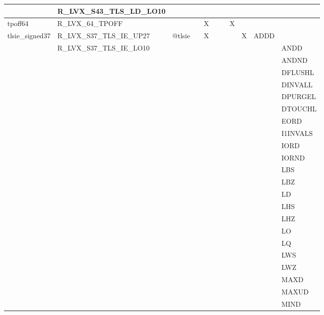 {\begin{tabular}{|l|l|l|l|l|l|l|l|l|l|l|}
 & \textsf{R\_LVX\_S43\_TLS\_LD\_LO10} & & & & & & & & & \\
\hline
\textsf{tpoff64} & \textsf{R\_LVX\_64\_TPOFF} & \textsf{} & \textsf{} & \textsf{X} & \textsf{} & \textsf{} & \textsf{X} & \textsf{} & \textsf{} \\
\hline
\textsf{tlsie\_signed37} & \textsf{R\_LVX\_S37\_TLS\_IE\_UP27} & \textsf{@tlsie} & \textsf{} & \textsf{X} & \textsf{} & \textsf{} & \textsf{} & \textsf{X} & \textsf{ADDD} \\
 & \textsf{R\_LVX\_S37\_TLS\_IE\_LO10} & & & & & & & & & \textsf{ANDD} \\
 & & & & & & & & & & \textsf{ANDND} \\
 & & & & & & & & & & \textsf{DFLUSHL} \\
 & & & & & & & & & & \textsf{DINVALL} \\
 & & & & & & & & & & \textsf{DPURGEL} \\
 & & & & & & & & & & \textsf{DTOUCHL} \\
 & & & & & & & & & & \textsf{EORD} \\
 & & & & & & & & & & \textsf{I1INVALS} \\
 & & & & & & & & & & \textsf{IORD} \\
 & & & & & & & & & & \textsf{IORND} \\
 & & & & & & & & & & \textsf{LBS} \\
 & & & & & & & & & & \textsf{LBZ} \\
 & & & & & & & & & & \textsf{LD} \\
 & & & & & & & & & & \textsf{LHS} \\
 & & & & & & & & & & \textsf{LHZ} \\
 & & & & & & & & & & \textsf{LO} \\
 & & & & & & & & & & \textsf{LQ} \\
 & & & & & & & & & & \textsf{LWS} \\
 & & & & & & & & & & \textsf{LWZ} \\
 & & & & & & & & & & \textsf{MAXD} \\
 & & & & & & & & & & \textsf{MAXUD} \\
 & & & & & & & & & & \textsf{MIND} \\
\hline\end{tabular}
}
\smallskip

